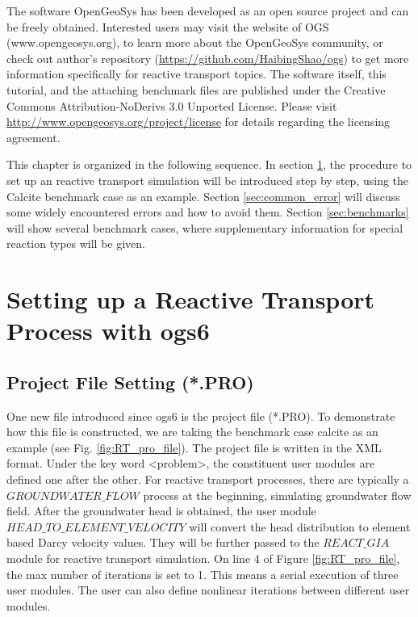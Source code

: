 The software OpenGeoSys has been developed as an open source project and can be freely obtained. Interested users may visit the website of OGS (www.opengeosys.org), to learn more about the OpenGeoSys community, or check out author’s repository (\url{https://github.com/HaibingShao/ogs}) to get more information specifically for reactive transport topics. The software itself, this tutorial, and the attaching benchmark files are published under the Creative Commons Attribution-NoDerivs 3.0 Unported License. Please visit \url{http://www.opengeosys.org/project/license} for details regarding the licensing agreement. 

This chapter is organized in the following sequence. In section \ref{sec:tutorial}, the procedure to set up an reactive transport simulation will be introduced step by step, using the Calcite benchmark case as an example. Section \ref{sec:common_error} will discuss some widely encountered errors and how to avoid them. Section \ref{sec:benchmarks} will show several benchmark cases, where supplementary information for special reaction types will be given. 

\section{Setting up a Reactive Transport Process with ogs6}
\label{sec:tutorial}
\subsection{Project File Setting (*.PRO)}
One new file introduced since ogs6 is the project file (*.PRO). To demonstrate how this file is constructed, we are taking the benchmark case calcite as an example (see Fig. \ref{fig:RT_pro_file}). The project file is written in the XML format. Under the key word <problem>, the constituent user modules are defined one after the other. For reactive transport processes, there are typically a $GROUNDWATER\_FLOW$ process at the beginning, simulating groundwater flow field. After the groundwater head is obtained, the user module $HEAD\_TO\_ELEMENT\_VELOCITY$ will convert the head distribution to element based Darcy velocity values. They will be further passed to the $REACT\_GIA$ module for reactive transport simulation. On line 4 of Figure \ref{fig:RT_pro_file}, the max number of iterations is set to 1. This means a serial execution of three user modules. The user can also define nonlinear iterations between different user modules. 

